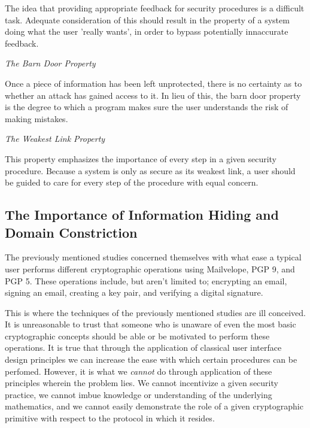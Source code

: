 \documentclass[journal]{IEEEtran}
\begin{document}
The idea that providing appropriate feedback for security procedures is a difficult task. Adequate consideration of this should result in the property of a system doing what the user 'really wants', in order to bypass potentially innaccurate feedback. 

\begin{center}\textit{The Barn Door Property}\\\end{center}

Once a piece of information has been left unprotected, there is no certainty as to whether an attack has gained access to it. In lieu of this, the barn door property is the degree to which a program makes sure the user understands the risk of making mistakes. 

\begin{center}\textit{The Weakest Link Property}\\\end{center}

This property emphasizes the importance of every step in a given security procedure. Because a system is only as secure as its weakest link, a user should be guided to care for every step of the procedure with equal concern.

\subsection{The Importance of Information Hiding and Domain Constriction}
The previously mentioned studies concerned themselves with what ease a typical user performs different cryptographic operations using Mailvelope, PGP 9, and PGP 5. These operations include, but aren't limited to; encrypting an email, signing an email, creating a key pair, and verifying a digital signature.

This is where the techniques of the previously mentioned studies are ill conceived. It is unreasonable to trust that someone who is unaware of even the most basic cryptographic concepts should be able or be motivated to perform these operations. It is true that through the application of classical user interface design principles we can increase the ease with which certain procedures can be perfomed. However, it is what we \textit{cannot} do through application of these principles wherein the problem lies. We cannot incentivize a given security practice, we cannot imbue knowledge or understanding of the underlying mathematics, and we cannot easily demonstrate the role of a given cryptographic primitive with respect to the protocol in which it resides.\\
\end{document}
